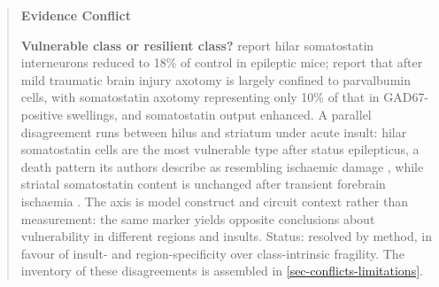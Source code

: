 \documentclass[11pt]{article}
\begin{document}
\begin{quote}
\noindent\textbf{Evidence Conflict}\par
\textbf{Vulnerable class or resilient class?} \citet{Hofmann2016} report hilar somatostatin interneurons reduced to 18\% of control in epileptic mice; \citet{Harris2022} report that after mild traumatic brain injury axotomy is largely confined to parvalbumin cells, with somatostatin axotomy representing only 10\% of that in GAD67-positive swellings, and somatostatin output enhanced. A parallel disagreement runs between hilus and striatum under acute insult: hilar somatostatin cells are the most vulnerable type after status epilepticus, a death pattern its authors describe as resembling ischaemic damage \citep{Freund1992}, while striatal somatostatin content is unchanged after transient forebrain ischaemia \citep{Uemura1990}. The axis is model construct and circuit context rather than measurement: the same marker yields opposite conclusions about vulnerability in different regions and insults. Status: resolved by method, in favour of insult- and region-specificity over class-intrinsic fragility. The inventory of these disagreements is assembled in \ref{sec-conflicts-limitations}.

\end{quote}
\end{document}
